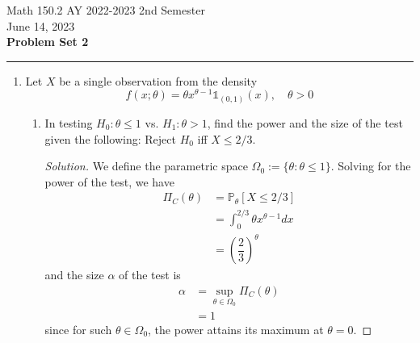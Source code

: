 \documentclass[12pt]{exam}
\begin{document}
\begin{flushleft}
Math 150.2 AY 2022-2023 2nd Semester
\\June 14, 2023
\\\textbf{Problem Set 2}
\end{flushleft}
\hrule
\vspace{0.3in}
\begin{enumerate}
    \item Let \(X\) be a single observation from the density
    \begin{equation*}
        f(x;\theta) = \theta x^{\theta -1}\mathbb{1}_{(0,1)}(x),\quad \theta > 0
    \end{equation*}
    \begin{enumerate}
        \item In testing \(H_0: \theta \leq 1\) vs. \(H_1: \theta > 1\), find the power and the size of the test given the following: Reject \(H_0\) iff \(X \leq 2/3\).
        \begin{proof}[Solution]
            We define the parametric space \(\Omega_0 :=\{\theta:\theta \leq 1\}\). Solving for the power of the test, we have
            \begin{align*}
                \Pi_C(\theta) &= \mathbb{P}_{\theta}[X\leq 2/3]
                \\&= \int_0^{2/3}\theta x^{\theta -1}dx
                \\&= \left(\dfrac{2}{3}\right)^{\theta}
            \end{align*}
            and the size \(\alpha\) of the test is
            \begin{align*}
                \alpha &= \sup_{\theta \in \Omega_0} \Pi_C(\theta)
                \\&= 1
            \end{align*}
            since for such \(\theta \in \Omega_0\), the power attains its maximum at \(\theta = 0\).
        \end{proof}
        

\end{enumerate}
\end{enumerate}
\end{document}

